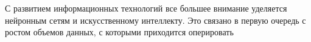 \label{sec:intro}

С развитием информационных технологий все большее внимание уделяется нейронным сетям и искусственному интеллекту. Это связано в первую очередь с ростом объемов данных, с которыми приходится оперировать
